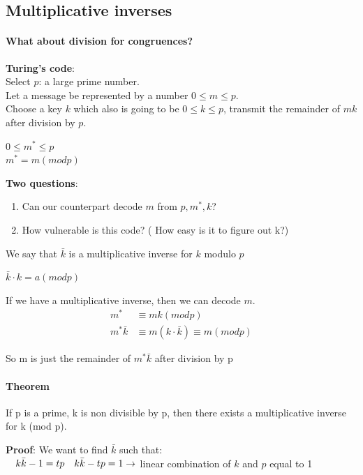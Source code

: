 \documentclass[9pt, letterpaper, oneside]{article}
\begin{document}
\subsection{Multiplicative inverses}

\paragraph{What about division for congruences?}
\textbf{Turing's code}:\\
Select $p$: a large prime number.\\
Let a message be represented by a number $0 \leq m \leq p$.\\
Choose a key $k$ which also is going to be $0 \leq k \leq p$, transmit the remainder of $mk$ after division by $p$.

$0 \leq m^* \leq p$\\
$m^* = m (mod p)$

\textbf{Two questions}:
\begin{enumerate}
    \item Can our counterpart decode $m$ from $p, m^*, k$?
    \item How vulnerable is this code? ( How easy is it to figure out k?)
\end{enumerate}

We say that $\bar{k}$ is a multiplicative inverse for $k$ modulo $p$

$\bar{k} \cdot k = a (mod p)$

If we have a multiplicative inverse, then we can decode $m$.
\begin{align*}
m^* &\equiv mk (mod p) \\
m^* \bar{k} &\equiv m(k \cdot \bar{k}) \equiv m (mod p)
\end{align*}

So m is just the remainder of $m^*\bar{k}$ after division by p

\paragraph{Theorem} 

If p is a prime, k is non divisible by p, then there exists a multiplicative inverse for k (mod p).

\textbf{Proof}:
We want to find $\bar{k}$ such that:\\
$\quad k\bar{k} - 1 = tp\\
\quad k\bar{k} - tp = 1 \to$ linear combination of $k$ and $p$ equal to 1\\
\end{document}
